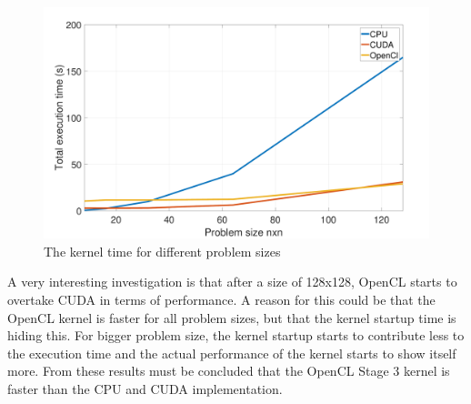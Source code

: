 \documentclass[final]{report}
\begin{document}
\begin{figure}[H]
\centering
    \includegraphics[width=\textwidth]{resources/kernel-time-per-problem-size-graph.pdf}
    \caption{The kernel time for different problem sizes}
    \label{fig:kernel-time-per-problem-size-graph}
\end{figure}

A very interesting investigation is that after a size of 128x128, OpenCL starts to overtake CUDA in terms of performance.
A reason for this could be that the OpenCL kernel is faster for all problem sizes, but that the kernel startup time is hiding this.
For bigger problem size, the kernel startup starts to contribute less to the execution time and the actual performance of the kernel starts to show itself more.
From these results must be concluded that the OpenCL Stage 3 kernel is faster than the CPU and CUDA implementation. 
\end{document}
